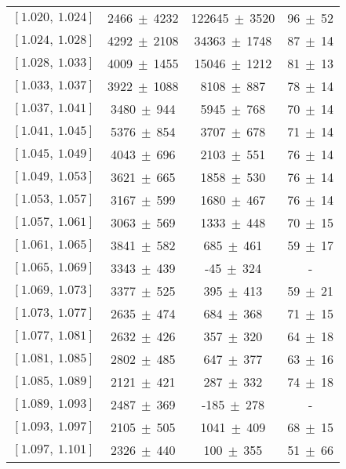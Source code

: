 \documentclass[aps,prd,twocolumn,showpacs,amsmath,amssymb]{revtex4-1}
\begin{document}
\begin{table*}[htbp]
\begin{center}
\begin{tabular}{cccc}
                $[1.020,\ 1.024]$   &	2466$\ \pm\ $4232&	122645$\ \pm\ $3520&	96$\ \pm\ $52 \\ 	
                $[1.024,\ 1.028]$   &	4292$\ \pm\ $2108&	34363$\ \pm\ $1748&	87$\ \pm\ $14 \\ 	
                $[1.028,\ 1.033]$   &	4009$\ \pm\ $1455&	15046$\ \pm\ $1212&	81$\ \pm\ $13 \\ 	
                $[1.033,\ 1.037]$   &	3922$\ \pm\ $1088&	8108$\ \pm\ $887&	78$\ \pm\ $14 \\ 	
                $[1.037,\ 1.041]$   &	3480$\ \pm\ $944&	5945$\ \pm\ $768&	70$\ \pm\ $14 \\ 	
                $[1.041,\ 1.045]$   &	5376$\ \pm\ $854&	3707$\ \pm\ $678&	71$\ \pm\ $14 \\ 	
                $[1.045,\ 1.049]$   &	4043$\ \pm\ $696&	2103$\ \pm\ $551&	76$\ \pm\ $14 \\ 	
                $[1.049,\ 1.053]$   &	3621$\ \pm\ $665&	1858$\ \pm\ $530&	76$\ \pm\ $14 \\ 	
                $[1.053,\ 1.057]$   &	3167$\ \pm\ $599&	1680$\ \pm\ $467&	76$\ \pm\ $14 \\ 	
                $[1.057,\ 1.061]$   &	3063$\ \pm\ $569&	1333$\ \pm\ $448&	70$\ \pm\ $15 \\ 	
                $[1.061,\ 1.065]$   &	3841$\ \pm\ $582&	685$\ \pm\ $461&	59$\ \pm\ $17 \\ 	
                $[1.065,\ 1.069]$   &	3343$\ \pm\ $439&	-45$\ \pm\ $324&	 - \\ 	
                $[1.069,\ 1.073]$   &	3377$\ \pm\ $525&	395$\ \pm\ $413&	59$\ \pm\ $21 \\ 	
                $[1.073,\ 1.077]$   &	2635$\ \pm\ $474&	684$\ \pm\ $368&	71$\ \pm\ $15 \\ 	
                $[1.077,\ 1.081]$   &	2632$\ \pm\ $426&	357$\ \pm\ $320&	64$\ \pm\ $18 \\ 	
                $[1.081,\ 1.085]$   &	2802$\ \pm\ $485&	647$\ \pm\ $377&	63$\ \pm\ $16 \\ 	
                $[1.085,\ 1.089]$   &	2121$\ \pm\ $421&	287$\ \pm\ $332&	74$\ \pm\ $18 \\ 	
                $[1.089,\ 1.093]$   &	2487$\ \pm\ $369&	-185$\ \pm\ $278&	 - \\ 	
                $[1.093,\ 1.097]$   &	2105$\ \pm\ $505&	1041$\ \pm\ $409&	68$\ \pm\ $15 \\ 	
                $[1.097,\ 1.101]$   &	2326$\ \pm\ $440&	100$\ \pm\ $355&	51$\ \pm\ $66 \\ 	

\end{tabular}
\end{center}
\end{table*}
\end{document}
